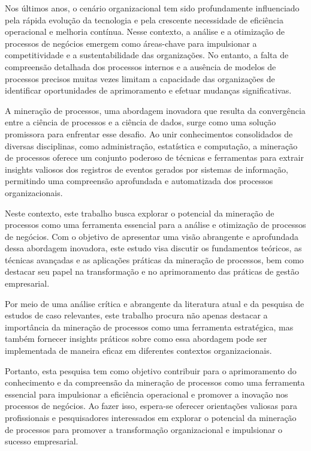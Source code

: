 \documentclass[tcc2]{classe_uftex/uftex}
\begin{document}
Nos últimos anos, o cenário organizacional tem sido profundamente influenciado pela rápida evolução da tecnologia e pela crescente necessidade de eficiência operacional e melhoria contínua. Nesse contexto, a análise e a otimização de processos de negócios emergem como áreas-chave para impulsionar a competitividade e a sustentabilidade das organizações. No entanto, a falta de compreensão detalhada dos processos internos e a ausência de modelos de processos precisos muitas vezes limitam a capacidade das organizações de identificar oportunidades de aprimoramento e efetuar mudanças significativas.

A mineração de processos, uma abordagem inovadora que resulta da convergência entre a ciência de processos e a ciência de dados, surge como uma solução promissora para enfrentar esse desafio. Ao unir conhecimentos consolidados de diversas disciplinas, como administração, estatística e computação, a mineração de processos oferece um conjunto poderoso de técnicas e ferramentas para extrair insights valiosos dos registros de eventos gerados por sistemas de informação, permitindo uma compreensão aprofundada e automatizada dos processos organizacionais.

Neste contexto, este trabalho busca explorar o potencial da mineração de processos como uma ferramenta essencial para a análise e otimização de processos de negócios. Com o objetivo de apresentar uma visão abrangente e aprofundada dessa abordagem inovadora, este estudo visa discutir os fundamentos teóricos, as técnicas avançadas e as aplicações práticas da mineração de processos, bem como destacar seu papel na transformação e no aprimoramento das práticas de gestão empresarial.

Por meio de uma análise crítica e abrangente da literatura atual e da pesquisa de estudos de caso relevantes, este trabalho procura não apenas destacar a importância da mineração de processos como uma ferramenta estratégica, mas também fornecer insights práticos sobre como essa abordagem pode ser implementada de maneira eficaz em diferentes contextos organizacionais.

Portanto, esta pesquisa tem como objetivo contribuir para o aprimoramento do conhecimento e da compreensão da mineração de processos como uma ferramenta essencial para impulsionar a eficiência operacional e promover a inovação nos processos de negócios. Ao fazer isso, espera-se oferecer orientações valiosas para profissionais e pesquisadores interessados em explorar o potencial da mineração de processos para promover a transformação organizacional e impulsionar o sucesso empresarial.
\end{document}
